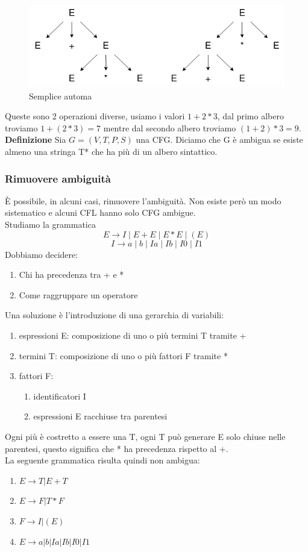 \documentclass[12pt]{article}
\begin{document}
\begin{figure}[ht]
  \includegraphics[scale = 0.5]{media/ambigua.png}
  \centering
  \caption{Semplice automa}
\end{figure}

\newpage 
Queste sono 2 operazioni diverse, usiamo i valori $1+2*3$, dal primo albero troviamo $1+(2*3)=7$ mentre dal secondo albero troviamo $(1+2)*3=9$.
\\ \textbf{Definizione} Sia $G=(V,T,P,S)$ una CFG. Diciamo che G è ambigua se esiste almeno una stringa T* che ha più di un albero sintattico. 

\subsubsection{Rimuovere ambiguità}
È possibile, in alcuni casi, rimuovere l'ambiguità. Non esiste però un modo sistematico e alcuni CFL hanno solo CFG ambigue. 
\\ Studiamo la grammatica 
\[ E \rightarrow I \;|\; E + E \;|\; E * E \;|\; (E)\]
\[ I \rightarrow a \;|\; b \;|\; Ia \;|\; Ib \;|\; I0 \; | \; I1\]
Dobbiamo decidere: 
\begin{enumerate}
  \item Chi ha precedenza tra + e *
  \item Come raggruppare un operatore
\end{enumerate}
Una soluzione è l'introduzione di una gerarchia di variabili: 
\begin{enumerate}
  \item espressioni E: composizione di uno o più termini T tramite +
  \item termini T: composizione di uno o più fattori F tramite *
  \item fattori F:
    \begin{enumerate}
      \item identificatori I
      \item espressioni E racchiuse tra parentesi
    \end{enumerate}
\end{enumerate}
Ogni più è costretto a essere una T, ogni T può generare E solo chiuse nelle parentesi, questo significa che * ha precedenza rispetto al +. 
\\ La seguente grammatica risulta quindi non ambigua: 
\begin{enumerate}
  \item $E \rightarrow T | E + T$
  \item $E \rightarrow F | T * F$
  \item $F \rightarrow I | (E) $
  \item $E \rightarrow a | b | Ia | Ib | I0 | I1$
\end{enumerate}
\end{document}
